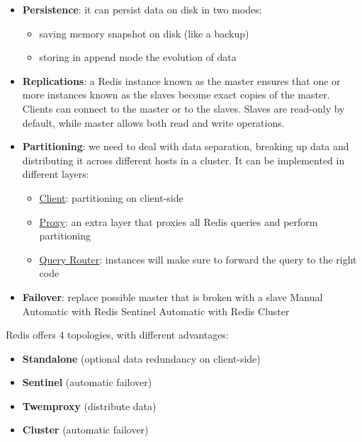 \documentclass[10pt,a4paper]{article}
\begin{document}
\begin{itemize}
	\item \textbf{Persistence}: it can persist data on disk in two modes:
	\begin{itemize}
		\item saving memory snapshot on disk (like a backup)
		\item storing in append mode the evolution of data
	\end{itemize}

	\item \textbf{Replications}: a Redis instance known as the master ensures that one or more instances known as the slaves become exact copies of the master. Clients can connect to the master or to the slaves. Slaves are read-only by default, while master allows both read and write operations.
	\item \textbf{Partitioning}: we need to deal with data separation, breaking up data and distributing it across different hosts in a cluster. It can be implemented in different layers:
	\begin{itemize}
		\item \uline{Client}: partitioning on client-side
		\item \uline{Proxy}: an extra layer that proxies all Redis queries and perform partitioning
		\item \uline{Query Router}: instances will make sure to forward the query to the right code
	\end{itemize}

	\item \textbf{Failover}: replace possible master that is broken with a slave
Manual
Automatic with Redis Sentinel
Automatic with Redis Cluster
\end{itemize}
Redis offers 4 topologies, with different advantages:
\begin{itemize}
	\item \textbf{Standalone} (optional data redundancy on client-side)
	\item \textbf{Sentinel} (automatic failover)
	\item \textbf{Twemproxy} (distribute data)
	\item \textbf{Cluster} (automatic failover)
\end{itemize}
\end{document}
